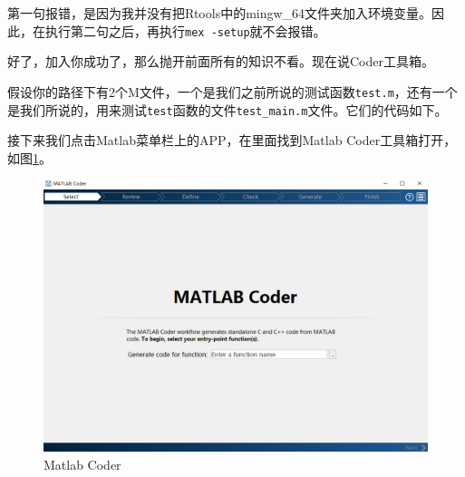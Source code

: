 \documentclass[]{ctexbook}
\newenvironment{Shaded}{\begin{snugshade}}{\end{snugshade}}
\newcommand{\FloatTok}[1]{\textcolor[rgb]{0.00,0.00,0.81}{#1}}
\newcommand{\CommentTok}[1]{\textcolor[rgb]{0.56,0.35,0.01}{\textit{#1}}}
\newcommand{\NormalTok}[1]{#1}
\theoremstyle{definition}
\theoremstyle{definition}
\theoremstyle{definition}
\theoremstyle{remark}
\begin{document}
第一句报错，是因为我并没有把Rtools中的mingw\_64文件夹加入环境变量。因此，在执行第二句之后，再执行\texttt{mex\ -setup}就不会报错。

好了，加入你成功了，那么抛开前面所有的知识不看。现在说Coder工具箱。

假设你的路径下有2个M文件，一个是我们之前所说的测试函数\texttt{test.m}，还有一个是我们所说的，用来测试\texttt{test}函数的文件\texttt{test\_main.m}文件。它们的代码如下。

\begin{Shaded}
\end{Shaded}

\begin{Shaded}
\end{Shaded}

接下来我们点击Matlab菜单栏上的APP，在里面找到Matlab
Coder工具箱打开，如图\ref{fig:coder1}。

\begin{figure}

{\centering \includegraphics[width=0.95\linewidth]{img/coder1} 

}

\caption{Matlab Coder}\label{fig:coder1}
\end{figure}
\end{document}
